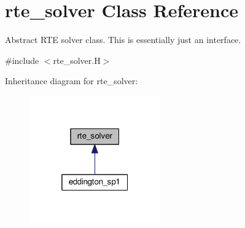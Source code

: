 \hypertarget{classrte__solver}{}\section{rte\+\_\+solver Class Reference}
\label{classrte__solver}


Abstract R\+TE solver class. This is essentially just an interface.  




{\ttfamily \#include $<$rte\+\_\+solver.\+H$>$}



Inheritance diagram for rte\+\_\+solver\+:\nopagebreak
\begin{figure}[H]
\begin{center}
\leavevmode
\includegraphics[width=160pt]{classrte__solver__inherit__graph}
\end{center}
\end{figure}

